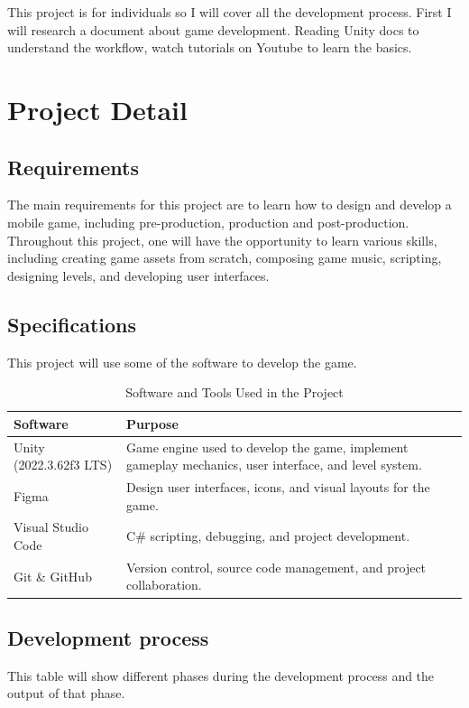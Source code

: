 \documentclass[a4paper,12pt]{report}
\begin{document}
This project is for individuals so I will cover all the development process. First I will
research a document about game development. Reading Unity docs to understand the
workflow, watch tutorials on Youtube to learn the basics.

\section{Project Detail}
\subsection{Requirements}
The main requirements for this project are to learn how to design and develop a mobile game, including pre-production, production and post-production. Throughout this project, one will have the opportunity to learn various skills, including creating game assets from scratch, composing game music, scripting, designing levels, and developing user interfaces.
\subsection{Specifications}
This project will use some of the software to develop the game.
\begin{table}[H]
\centering
\label{tab:software_tools}
\begin{tabular}{|p{5cm}|p{8cm}|}
\hline
\textbf{Software} & \textbf{Purpose} \\ \hline

Unity (2022.3.62f3 LTS) &
Game engine used to develop the game, implement gameplay mechanics, user interface, and level system. \\ \hline

Figma &
Design user interfaces, icons, and visual layouts for the game. \\ \hline

Visual Studio Code &
C\# scripting, debugging, and project development. \\ \hline

Git \& GitHub &
Version control, source code management, and project collaboration. \\ \hline
\end{tabular}
\caption{Software and Tools Used in the Project}
\end{table}



\subsection{Development process}
This table will show different phases during the development process and the output of that phase.
\end{document}
